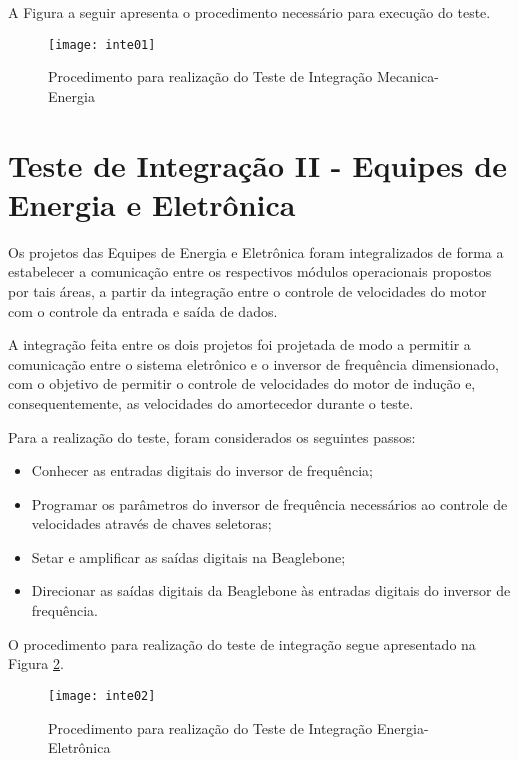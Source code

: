 		A Figura a seguir apresenta o procedimento necessário para execução do teste.

		\begin{figure}[htpb]
			\centering
			\texttt{[image: inte01]}
			\caption{Procedimento para realização do Teste de Integração Mecanica-Energia}
			\label{inte01}
		\end{figure}


	\section{Teste de Integração II - Equipes de Energia e Eletrônica}
	\label{sec:inte22}

		Os projetos das Equipes de Energia e Eletrônica foram integralizados de forma a estabelecer a comunicação entre os respectivos módulos operacionais propostos por tais áreas, a partir da integração entre o controle de velocidades do motor com o controle da entrada e saída de dados.
		
		A integração feita entre os dois projetos foi projetada de modo a permitir a comunicação entre o sistema eletrônico e o inversor de frequência dimensionado, com o objetivo de permitir o controle de velocidades do motor de indução e, consequentemente, as velocidades do amortecedor durante o teste.

		
		Para a realização do teste, foram considerados os seguintes passos:

		\begin{itemize}
			\item Conhecer as entradas digitais do inversor de frequência;
			\item Programar os parâmetros do inversor de frequência necessários ao controle de velocidades através de chaves seletoras;
			\item Setar e amplificar as saídas digitais na Beaglebone;
			\item Direcionar as saídas digitais da Beaglebone às entradas digitais do inversor de frequência.
		\end{itemize}

		O procedimento para realização do teste de integração segue apresentado na Figura \ref{inte02}.

		\begin{figure}[htpb]
			\centering
			\texttt{[image: inte02]}
			\caption{Procedimento para realização do Teste de Integração Energia-Eletrônica}
			\label{inte02}
		\end{figure}

